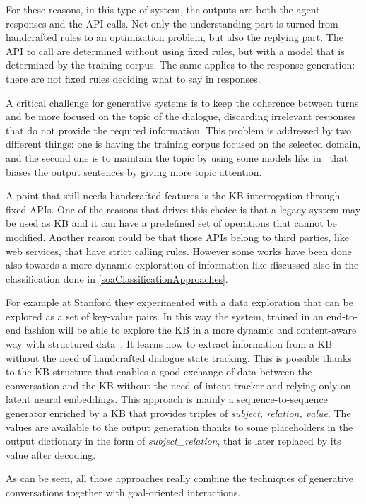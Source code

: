 For these reasons, in this type of system, the outputs are both the agent responses and the API calls. Not only the understanding part is turned from handcrafted rules to an optimization problem, but also the replying part. The API to call are determined without using fixed rules, but with a model that is determined by the training corpus. The same applies to the response generation: there are not fixed rules deciding what to say in responses.

A critical challenge for generative systems is to keep the coherence between turns and be more focused on the topic of the dialogue, discarding irrelevant responses that do not provide the required information. This problem is addressed by two different things: one is having the training corpus focused on the selected domain, and the second one is to maintain the topic by using some models like in~\cite{xing2017topic} that biases the output sentences by giving more topic attention.

A point that still needs handcrafted features is the KB interrogation through fixed APIs. One of the reasons that drives this choice is that a legacy system may be used as KB and it can have a predefined set of operations that cannot be modified. Another reason could be that those APIs belong to third parties, like web services, that have strict calling rules. However some works have been done also towards a more dynamic exploration of information like discussed also in the classification done in \ref{soaClassificationApproaches}.

For example at Stanford they experimented with a data exploration that can be explored as a set of key-value pairs. In this way the system, trained in an end-to-end fashion will be able to explore the KB in a more dynamic and content-aware way with structured data~\cite{eric2017key}. It learns how to extract information from a KB without the need of handcrafted dialogue state tracking. This is possible thanks to the KB structure that enables a good exchange of data between the conversation and the KB without the need of intent tracker and relying only on latent neural embeddings. This approach is mainly a sequence-to-sequence generator enriched by a KB that provides triples of \textit{subject, relation, value}. The values are available to the output generation thanks to some placeholders in the output dictionary in the form of \textit{subject\_relation}, that is later replaced by its value after decoding.

As can be seen, all those approaches really combine the techniques of generative conversations together with goal-oriented interactions.

